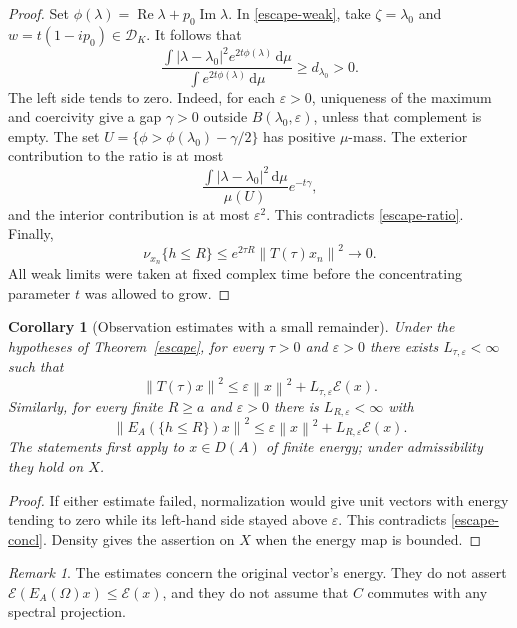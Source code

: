 \documentclass[11pt,a4paper]{article}
\newtheorem{corollary}[theorem]{Corollary}
\theoremstyle{definition}\newtheorem{definition}[theorem]{Definition}
\theoremstyle{remark}\newtheorem{remark}[theorem]{Remark}
\newcommand{\E}{\mathcal E}\newcommand{\D}{\mathcal D}
\newcommand{\dd}{\,\mathrm d}
\DeclareMathOperator{\Rea}{Re}\DeclareMathOperator{\Ima}{Im}
\newcommand{\norm}[1]{\left\lVert #1\right\rVert}
\begin{document}
\begin{proof}
Set $\phi(\lambda)=\Rea\lambda+p_0\Ima\lambda$. In \eqref{escape-weak}, take $\zeta=\lambda_0$ and $w=t(1-ip_0)\in\D_K$. It follows that
\begin{equation}\label{escape-ratio}
 \frac{\int|\lambda-\lambda_0|^2e^{2t\phi(\lambda)}\dd\mu}
 {\int e^{2t\phi(\lambda)}\dd\mu}\ge d_{\lambda_0}>0.
\end{equation}
The left side tends to zero. Indeed, for each $\varepsilon>0$, uniqueness of the maximum and coercivity give a gap $\gamma>0$ outside $B(\lambda_0,\varepsilon)$, unless that complement is empty. The set $U=\{\phi>\phi(\lambda_0)-\gamma/2\}$ has positive $\mu$-mass. The exterior contribution to the ratio is at most
\[
 \frac{\int|\lambda-\lambda_0|^2\dd\mu}{\mu(U)}e^{-t\gamma},
\]
and the interior contribution is at most $\varepsilon^2$. This contradicts \eqref{escape-ratio}. Finally,
\[
 \nu_{x_n}\{h\le R\}\le e^{2\tau R}\norm{T(\tau)x_n}^2\to0.
\]
All weak limits were taken at fixed complex time before the concentrating parameter $t$ was allowed to grow.
\end{proof}

\begin{corollary}[Observation estimates with a small remainder]\label{weak-est}
Under the hypotheses of Theorem~\ref{escape}, for every $\tau>0$ and $\varepsilon>0$ there exists $L_{\tau,\varepsilon}<\infty$ such that
\[
 \norm{T(\tau)x}^2\le\varepsilon\norm{x}^2+L_{\tau,\varepsilon}\E(x).
\]
Similarly, for every finite $R\ge a$ and $\varepsilon>0$ there is $L_{R,\varepsilon}<\infty$ with
\[
 \norm{E_A(\{h\le R\})x}^2\le\varepsilon\norm{x}^2+L_{R,\varepsilon}\E(x).
\]
The statements first apply to $x\in D(A)$ of finite energy; under admissibility they hold on $X$.
\end{corollary}
\begin{proof}
If either estimate failed, normalization would give unit vectors with energy tending to zero while its left-hand side stayed above $\varepsilon$. This contradicts \eqref{escape-concl}. Density gives the assertion on $X$ when the energy map is bounded.
\end{proof}
\begin{remark}
The estimates concern the original vector's energy. They do not assert $\E(E_A(\Omega)x)\le\E(x)$, and they do not assume that $C$ commutes with any spectral projection.
\end{remark}
\end{document}
